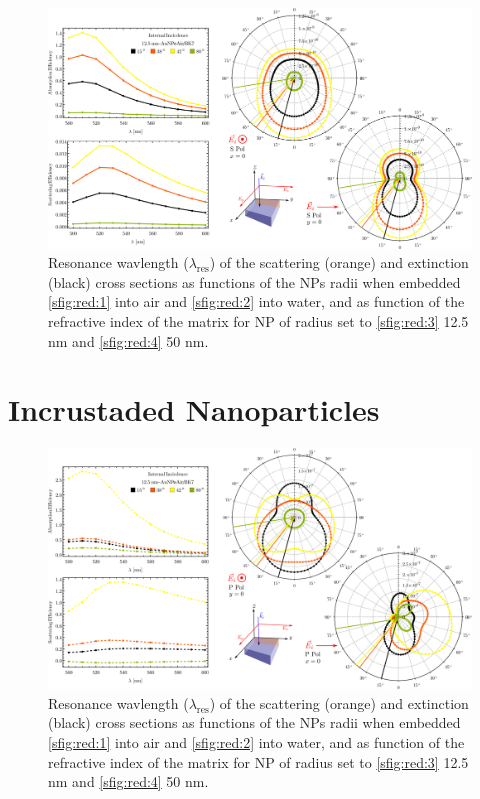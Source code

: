 \begin{figure}\centering
\includegraphics[width = .9\textwidth ]{2-Results-Figs/incidencia-iterna/angle_internal_s.png}%
\caption[Convergence tests: The Meshing]{Resonance wavlength ($\lambda_\text{res}$) of the scattering (orange) and extinction (black) cross sections as functions of the NPs radii when embedded  \ref{sfig:red:1} into air and \ref{sfig:red:2} into water, and as function of the refractive index of the matrix for NP of radius set to  \ref{sfig:red:3} 12.5 nm and \ref{sfig:red:4} 50 nm.}
\end{figure}


\section{Incrustaded Nanoparticles}



\begin{figure}\centering
\includegraphics[width = .9\textwidth ]{2-Results-Figs/incidencia-iterna/angle_internal_p.png}%
\caption[Convergence tests: The Meshing]{Resonance wavlength ($\lambda_\text{res}$) of the scattering (orange) and extinction (black) cross sections as functions of the NPs radii when embedded  \ref{sfig:red:1} into air and \ref{sfig:red:2} into water, and as function of the refractive index of the matrix for NP of radius set to  \ref{sfig:red:3} 12.5 nm and \ref{sfig:red:4} 50 nm.}
\end{figure}







